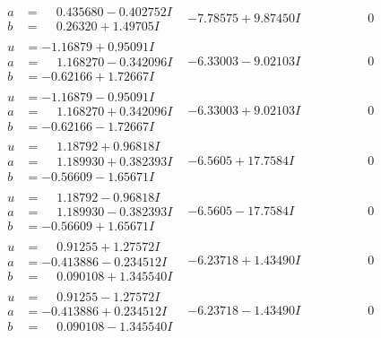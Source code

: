 \documentclass[1p]{elsarticle_modified}
\theoremstyle{definition}
\begin{document}
$$\begin{array}{c|c|c}
\begin{aligned}
a &= \phantom{-}0.435680 - 0.402752 I \\
b &= \phantom{-}0.26320 + 1.49705 I\end{aligned}
 & -7.78575 + 9.87450 I & \phantom{-0.000000 } 0 \\ \hline\begin{aligned}
u &= -1.16879 + 0.95091 I \\
a &= \phantom{-}1.168270 - 0.342096 I \\
b &= -0.62166 + 1.72667 I\end{aligned}
 & -6.33003 - 9.02103 I & \phantom{-0.000000 } 0 \\ \hline\begin{aligned}
u &= -1.16879 - 0.95091 I \\
a &= \phantom{-}1.168270 + 0.342096 I \\
b &= -0.62166 - 1.72667 I\end{aligned}
 & -6.33003 + 9.02103 I & \phantom{-0.000000 } 0 \\ \hline\begin{aligned}
u &= \phantom{-}1.18792 + 0.96818 I \\
a &= \phantom{-}1.189930 + 0.382393 I \\
b &= -0.56609 - 1.65671 I\end{aligned}
 & -6.5605 + 17.7584 I & \phantom{-0.000000 } 0 \\ \hline\begin{aligned}
u &= \phantom{-}1.18792 - 0.96818 I \\
a &= \phantom{-}1.189930 - 0.382393 I \\
b &= -0.56609 + 1.65671 I\end{aligned}
 & -6.5605 - 17.7584 I & \phantom{-0.000000 } 0 \\ \hline\begin{aligned}
u &= \phantom{-}0.91255 + 1.27572 I \\
a &= -0.413886 - 0.234512 I \\
b &= \phantom{-}0.090108 + 1.345540 I\end{aligned}
 & -6.23718 + 1.43490 I & \phantom{-0.000000 } 0 \\ \hline\begin{aligned}
u &= \phantom{-}0.91255 - 1.27572 I \\
a &= -0.413886 + 0.234512 I \\
b &= \phantom{-}0.090108 - 1.345540 I\end{aligned}
 & -6.23718 - 1.43490 I & \phantom{-0.000000 } 0 \\ \hline\begin{aligned}

\end{aligned}
\end{array}$$
\end{document}
